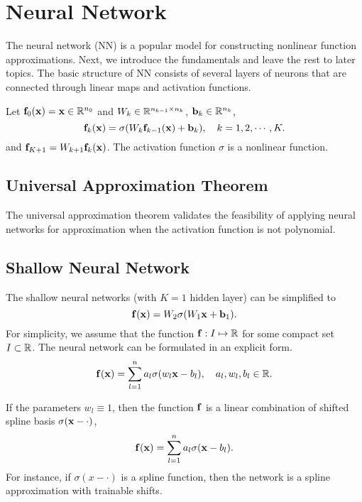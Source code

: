 \section{Neural Network}
The neural network (NN) is a popular model for constructing nonlinear function approximations. Next, we introduce the fundamentals and leave the rest to later topics. The basic structure of NN consists of several layers of neurons that are connected through linear maps and activation functions. 

\begin{example}
Let $\mathbf f_0(\mathbf x) = \mathbf x\in \mathbb R^{n_0}$ and $W_k\in \mathbb R^{n_{k-1}\times n_k}$, $\mathbf b_k \in \mathbb R^{n_k}$, 
\begin{equation}
    \mathbf f_k(\mathbf x) = \sigma(W_k \mathbf f_{k-1}(\mathbf x) + \mathbf b_k) , \quad k=1, 2,\cdots, K.
\end{equation}
and
$\mathbf f_{K+1} = W_{k+1} \mathbf f_k(\mathbf x)$. 
The activation function $\sigma$ is a nonlinear function. 
\end{example}
\subsection{Universal Approximation Theorem}
The universal approximation theorem validates the feasibility of applying neural networks for approximation when the activation function is not polynomial. 
\subsection{Shallow Neural Network}
The shallow neural networks (with $K=1$ hidden layer) can be simplified to 
\begin{equation}
    \mathbf f(\mathbf x) = W_{2}\sigma(W_1 \mathbf x + \mathbf b_1).
\end{equation}
For simplicity, we assume that the function $\mathbf f: I\mapsto \mathbb R$ for some compact set $I\subset \mathbb R$. The neural network can be formulated in an explicit form. 
\begin{equation}
    \mathbf f(\mathbf x) = \sum_{l=1}^n a_l \sigma(w_l \mathbf x - b_l),\quad a_l, w_l, b_l\in\mathbb R.
\end{equation}
\begin{example}
    If the parameters $w_l\equiv 1$, then the function $\mathbf f$ is a linear combination of shifted spline basis $\sigma(\mathbf x -\cdot)$, 
    \begin{equation}
     \mathbf f(\mathbf x) = \sum_{l=1}^n a_l \sigma(\mathbf x - b_l).
    \end{equation}
    For instance, if $\sigma(x - \cdot)$ is a spline function, then the network is a spline approximation with trainable shifts.
\end{example}

